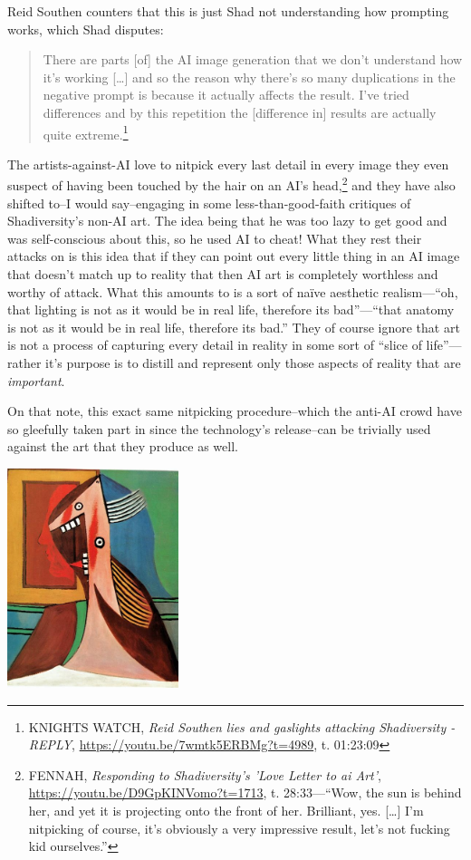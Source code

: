 \documentclass[11pt]{article}
\begin{document}
Reid Southen counters that this is just Shad not understanding how prompting works, which Shad disputes:
\begin{quote}
There are parts [of] the AI image generation that we don't understand how it's working [\ldots{}] and so the reason why there's so many duplications in the negative prompt is because it actually affects the result. I've tried differences and by this repetition the [difference in] results are actually quite extreme.\footnote{KNIGHTS WATCH, \emph{Reid Southen lies and gaslights attacking Shadiversity - REPLY}, \url{https://youtu.be/7wmtk5ERBMg?t=4989}, t. 01:23:09}
\end{quote}

The artists-against-AI love to nitpick every last detail in every image they even suspect of having been touched by the hair on an AI's head,\footnote{FENNAH, \emph{Responding to Shadiversity's 'Love Letter to ai Art'}, \url{https://youtu.be/D9GpKINVomo?t=1713}, t. 28:33---``Wow, the sun is behind her, and yet it is projecting onto the front of her. Brilliant, yes. [\ldots{}] I'm nitpicking of course, it's obviously a very impressive result, let's not fucking kid ourselves.''} and they have also shifted to--I would say--engaging in some less-than-good-faith critiques of Shadiversity's non-AI art. The idea being that he was too lazy to get good and was self-conscious about this, so he used AI to cheat! What they rest their attacks on is this idea that if they can point out every little thing in an AI image that doesn't match up to reality that then AI art is completely worthless and worthy of attack. What this amounts to is a sort of naïve aesthetic realism---``oh, that lighting is not as it would be in real life, therefore its bad''---``that anatomy is not as it would be in real life, therefore its bad.'' They of course ignore that art is not a process of capturing every detail in reality in some sort of ``slice of life''---rather it's purpose is to distill and represent only those aspects of reality that are \emph{important}.

On that note, this exact same nitpicking procedure--which the anti-AI crowd have so gleefully taken part in since the technology's release--can be trivially used against the art that they produce as well.

\begin{center}
\includegraphics[width=5cm]{./images/picasso womans head.jpg}
\end{center}
\end{document}
